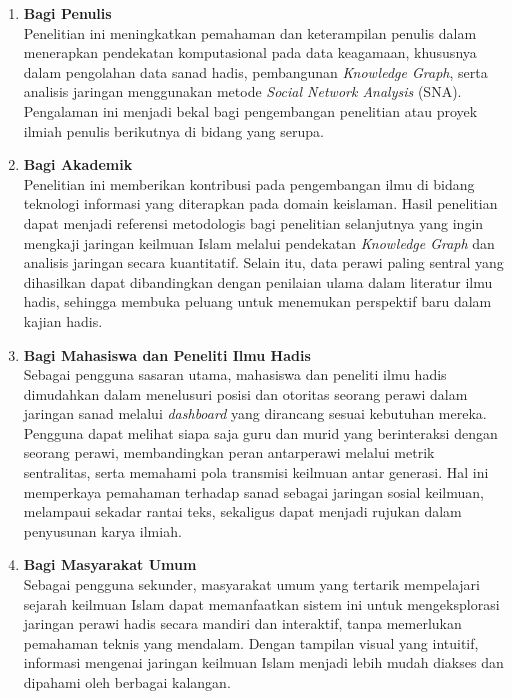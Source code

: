 \begin{enumerate}
	\item \textbf{Bagi Penulis}\\
	Penelitian ini meningkatkan pemahaman dan keterampilan penulis dalam menerapkan pendekatan komputasional pada data keagamaan, khususnya dalam pengolahan data sanad hadis, pembangunan \textit{Knowledge Graph}, serta analisis jaringan menggunakan metode \textit{Social Network Analysis} (SNA). Pengalaman ini menjadi bekal bagi pengembangan penelitian atau proyek ilmiah penulis berikutnya di bidang yang serupa.

	\item \textbf{Bagi Akademik}\\
	Penelitian ini memberikan kontribusi pada pengembangan ilmu di bidang teknologi informasi yang diterapkan pada domain keislaman. Hasil penelitian dapat menjadi referensi metodologis bagi penelitian selanjutnya yang ingin mengkaji jaringan keilmuan Islam melalui pendekatan \textit{Knowledge Graph} dan analisis jaringan secara kuantitatif. Selain itu, data perawi paling sentral yang dihasilkan dapat dibanding\-kan dengan penilaian ulama dalam literatur ilmu hadis, sehingga membuka peluang untuk menemukan perspektif baru dalam kajian hadis.

	\item \textbf{Bagi Mahasiswa dan Peneliti Ilmu Hadis}\\
	Sebagai pengguna sasaran utama, mahasiswa dan peneliti ilmu hadis dimudahkan dalam menelusuri posisi dan otoritas seorang perawi dalam jaringan sanad melalui \textit{dashboard} yang dirancang sesuai kebutuhan mereka. Pengguna dapat melihat siapa saja guru dan murid yang berinteraksi dengan seorang perawi, membandingkan peran antarperawi melalui metrik sentralitas, serta memahami pola transmisi keilmuan antar generasi. Hal ini memperkaya pemahaman terhadap sanad sebagai jaringan sosial keilmuan, melampaui sekadar rantai teks, sekaligus dapat menjadi rujukan dalam penyusunan karya ilmiah.

	\item \textbf{Bagi Masyarakat Umum}\\
	Sebagai pengguna sekunder, masyarakat umum yang tertarik mempelajari sejarah keilmuan Islam dapat memanfaatkan sistem ini untuk mengeksplorasi jaringan perawi hadis secara mandiri dan interaktif, tanpa memerlukan pemahaman teknis yang mendalam. Dengan tampilan visual yang intuitif, informasi mengenai jaringan keilmuan Islam menjadi lebih mudah diakses dan dipahami oleh berbagai kalangan.
\end{enumerate}



